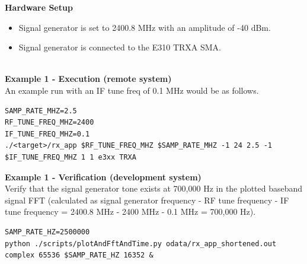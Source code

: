 \noindent\textbf{Hardware Setup}
\begin{itemize}
  \item Signal generator is set to 2400.8 MHz with an amplitude of -40 dBm.
  \item Signal generator is connected to the E310 TRXA SMA.
\end{itemize}
\textbf{\\Example 1 - Execution (remote system)}\\
An example run with an IF tune freq of 0.1 MHz would be as follows.
\begin{lstlisting}
SAMP_RATE_MHZ=2.5
RF_TUNE_FREQ_MHZ=2400
IF_TUNE_FREQ_MHZ=0.1
./<target>/rx_app $RF_TUNE_FREQ_MHZ $SAMP_RATE_MHZ -1 24 2.5 -1 $IF_TUNE_FREQ_MHZ 1 1 e3xx TRXA
\end{lstlisting}
\noindent\textbf{Example 1 - Verification (development system)}\\
Verify that the signal generator tone exists at 700,000 Hz in the plotted baseband signal FFT (calculated as signal generator frequency - RF tune frequency - IF tune frequency = 2400.8 MHz - 2400 MHz - 0.1 MHz = 700,000 Hz).
\begin{lstlisting}
SAMP_RATE_HZ=2500000
python ./scripts/plotAndFftAndTime.py odata/rx_app_shortened.out complex 65536 $SAMP_RATE_HZ 16352 &
\end{lstlisting}
